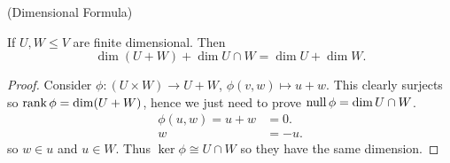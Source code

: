 \begin{prop} (Dimensional Formula)

  If $U, W \leq V$ are finite dimensional. Then
  \[\dim (U + W) + \dim U \cap W = \dim U +\dim  W.\]
    
\end{prop}
\begin{proof}
   Consider $\phi : (U \times W) \rightarrow U + W$, $\phi(v, w) \mapsto u + w$. This clearly surjects so $\operatorname{rank} \phi = \dim (U + W)$, hence we just need to prove $\operatorname{null} \phi = \dim U \cap W$.
   \begin{align*}
     \phi(u, w) = u + w &= 0. \\
     w &= -u
   .\end{align*}
   so $w \in u$ and $u \in W$. Thus $\ker \phi \cong U \cap W$ so they have the same dimension.
\end{proof}

